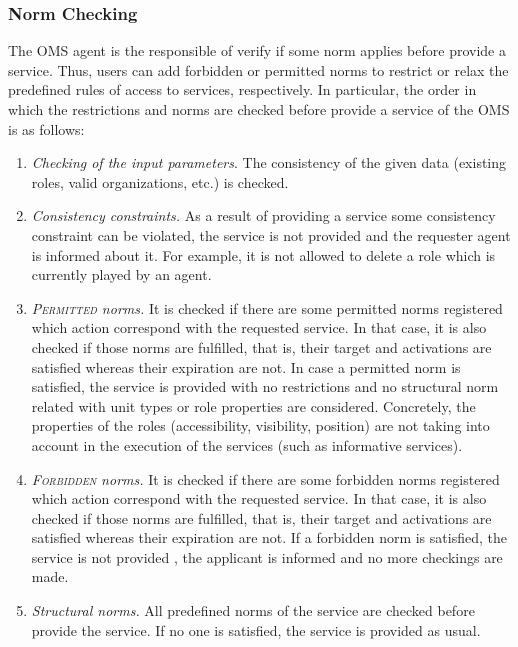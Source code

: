 \subsubsection{Norm Checking}

The OMS agent is the responsible of verify if some norm applies before provide a service. Thus, users can add forbidden or permitted norms to restrict or relax the predefined rules of access to services,  respectively. In particular, the order in which the restrictions and norms are checked before provide a service of the OMS is as follows: 
\begin{enumerate}
\item \textit{Checking of the input parameters}. The consistency of the given data (existing roles, valid organizations, etc.) is checked.

\item \textit{Consistency constraints.} As a result of providing a service some consistency constraint can be  violated, the service is not provided and the requester agent is informed about it. For example, it is not allowed to delete a role which is currently played by an agent.

\item \textit{\textsc{Permitted} norms.} It is checked if there are some permitted norms registered which action correspond with the requested service. In that case, it is also checked if those norms are fulfilled, that is, their target and activations are satisfied whereas their expiration are not. In case a permitted norm is satisfied, the service is provided with no restrictions and  no structural norm related with unit types or role properties are considered. Concretely, the properties of the roles (accessibility, visibility, position) are not taking into account in the execution of the services (such as informative services).

\item \textit{\textsc{Forbidden} norms.}  It is checked if there are some forbidden norms registered which action correspond with the requested service. In that case, it is also checked if those norms are fulfilled, that is, their target and activations are satisfied whereas their expiration are not. If a forbidden norm is satisfied, the service is not provided , the applicant is informed and no more checkings are made. 

\item \textit{Structural norms.} All predefined norms of the service are checked before provide the service. If no one is satisfied, the service is provided as usual.


\end{enumerate}
